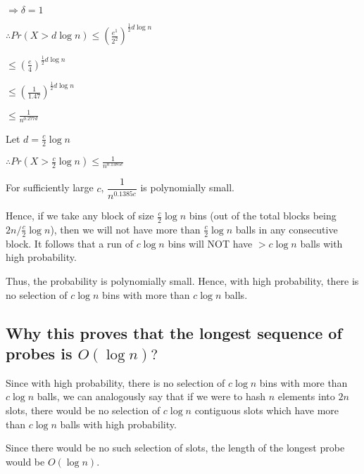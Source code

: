 \documentclass{article}
\begin{document}
$\Rightarrow \delta = 1$

$\therefore Pr(X > d\log{n}) \le \left( \frac{e^1}{2^2} \right)^{\frac{1}{2}d\log{n}}$

$\le \left( \frac{e}{4} \right)^{\frac{1}{2}d\log{n}}$

$\le \left( \frac{1}{1.47} \right)^{\frac{1}{2}d\log{n}}$

$\le \frac{1}{n^{0.277d}}$

Let $d = \frac{c}{2}\log{n}$

$\therefore Pr(X > \frac{c}{2}\log{n}) \le \frac{1}{n^{0.1385c}}$

For sufficiently large $c$, $\dfrac{1}{n^{0.1385c}}$ is polynomially
small.

Hence, if we take any block of size $\frac{c}{2}\log{n}$ bins (out of
the total blocks being ${2n}/{\frac{c}{2}\log{n}}$), then we will
not have more than $\frac{c}{2}\log{n}$ balls in any consecutive
block. It follows that a run of $c\log{n}$ bins will NOT have $>
c\log{n}$ balls with high probability.

Thus, the probability is polynomially small. Hence, with high
probability, there is no selection of $c\log{n}$ bins with more than
$c\log{n}$ balls.

\subsection{Why this proves that the longest sequence of probes
is $O(\log{n})?$}

Since with high probability, there is no selection of $c\log{n}$ bins
with more than $c\log{n}$ balls, we can analogously say that if we
were to hash $n$ elements into $2n$ slots, there would be no selection
of $c\log{n}$ contiguous slots which have more than $c\log{n}$ balls
with high probability.

Since there would be no such selection of slots, the length of the
longest probe would be $O(\log{n})$.

\clearpage
\end{document}
